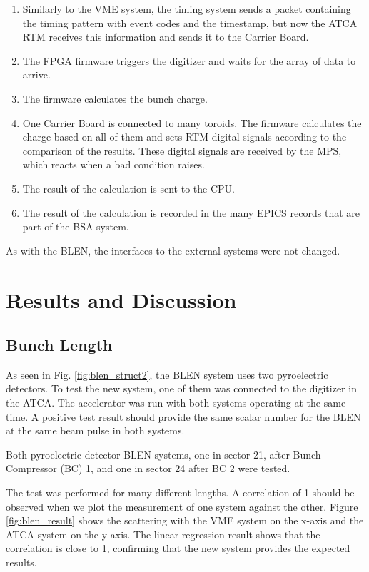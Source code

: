 \documentclass[letter,
        biblatex,   %
        keeplastbox,  %
        ]{jacow}
\begin{document}
\begin{enumerate}
  \item Similarly to the VME system, the timing system sends a packet containing the timing pattern with event codes and the timestamp, but now the ATCA RTM receives this information and sends it to the Carrier Board.
  \item The FPGA firmware triggers the digitizer and waits for the array of data to arrive.
  \item The firmware calculates the bunch charge.
  \item One Carrier Board is connected to many toroids. The firmware calculates the charge based on all of them and sets RTM digital signals according to the comparison of the results. These digital signals are received by the MPS, which reacts when a bad condition raises.
  \item The result of the calculation is sent to the CPU.
  \item The result of the calculation is recorded in the many EPICS records that are part of the BSA system.
\end{enumerate}

As with the BLEN, the interfaces to the external systems were not changed.

\section{Results and Discussion}
\subsection{Bunch Length}
As seen in Fig. \ref{fig:blen_struct2}, the BLEN system uses two pyroelectric detectors. To test the new system, one of them was connected to the digitizer in the ATCA. The accelerator was run with both systems operating at the same time. A positive test result should provide the same scalar number for the BLEN at the same beam pulse in both systems.

Both pyroelectric detector BLEN systems, one in sector 21, after Bunch Compressor (BC) 1, and one in sector 24 after BC 2 were tested.

The test was performed for many different lengths. A correlation of 1 should be observed when we plot the measurement of one system against the other. Figure \ref{fig:blen_result} shows the scattering with the VME system on the x-axis and the ATCA system on the y-axis. The linear regression result shows that the correlation is close to 1, confirming that the new system provides the expected results.
\end{document}
